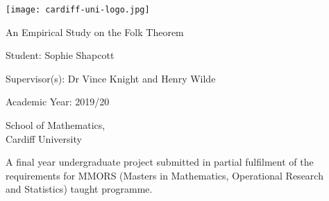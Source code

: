 \begin{titlepage}
	\begin{center}
		\vspace*{0.5cm}
		\texttt{[image: cardiff-uni-logo.jpg]}

		\vspace{1cm}

		\huge
		An Empirical Study on the Folk Theorem

		\vspace{2cm}

		\large
		Student: Sophie Shapcott

		\vspace{0.5cm}

		Supervisor{(s)}: Dr Vince Knight and Henry Wilde 

		\vspace{0.5cm}

		Academic Year: 2019/20
		
		\vspace{0.5cm}

		School of Mathematics, \\Cardiff University

		\vfill

		\normalsize
		A final year undergraduate project submitted in partial fulfilment of the\\ requirements for MMORS (Masters in Mathematics, Operational Research\\ and Statistics) taught programme.

	\end{center}
\end{titlepage}